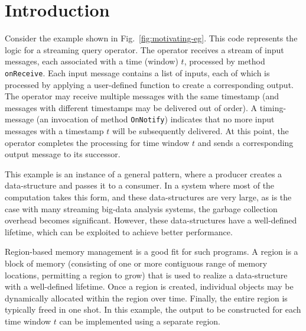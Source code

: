 \newcommand{\TODO}[1]{\textbf{TODO: #1}}
\newcommand{\eg}{\emph{e.g.}}
\newcommand{\ie}{\emph{i.e.}}

\section{Introduction}
\label{sec:introduction}

Consider the example shown in Fig.~\ref{fig:motivating-eg}.
This code represents the logic for a streaming query operator.
The operator receives a stream of input messages, each associated
with a time (window) $t$, processed by method \texttt{onReceive}.
Each input message contains a list of inputs, each of which is processed
by applying a user-defined function to create a corresponding output.
The operator may receive multiple messages with the same timestamp
(and messages with different timestamps may be delivered out of order).
A timing-message (an invocation of method \texttt{OnNotify}) indicates that
no more input messages with a timestamp $t$ will be subsequently delivered.
At this point, the operator completes the processing for time window $t$ and sends
a corresponding output message to its successor.



This example is an instance of a general pattern, where a producer
creates a data-structure and passes it to a consumer.  In a system
where most of the computation takes this form, and these
data-structures are very large, as is the case with many streaming
big-data analysis systems, the garbage collection overhead becomes
significant.
However, these data-structures have a well-defined lifetime, which can
be exploited to achieve better performance.

Region-based memory management is a good fit for such programs.
A region is a block of memory (consisting of one or more contiguous
range of memory locations, permitting a region to grow) that is used to realize
a data-structure with a well-defined lifetime. 
Once a region is created, individual objects may be dynamically allocated within
the region over time. Finally, the entire region is typically freed in one shot.
In this example, the output to be constructed for each time window $t$ can be
implemented using a separate region.

